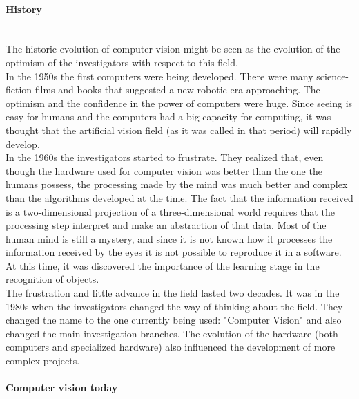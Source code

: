 \paragraph{History}\mbox{}\\

The historic evolution of computer vision might be seen as the evolution of the optimism of the investigators with respect to this field. 
\\

In the 1950s the first computers were being developed. There were many science-fiction films and books that suggested a new robotic era approaching. The optimism and the confidence in the power of computers were huge. 
Since seeing is easy for humans and the computers had a big capacity for computing, it was thought that the artificial vision field (as it was called in that period) will rapidly develop. 
\\

In the 1960s the investigators started to frustrate. They realized that, even though the hardware used for computer vision was better than the one the humans possess, the processing made by the mind was much better and complex than the algorithms developed at the time. 
The fact that the information received is a two-dimensional projection of a three-dimensional world requires that the processing step interpret and make an abstraction of that data. Most of the human mind is still a mystery, and since it is not known how it processes the information received by the eyes it is not possible to reproduce it in a software. 
At this time, it was discovered the importance of the learning stage in the recognition of objects. 
\\

The frustration and little advance in the field lasted two decades. It was in the 1980s when the investigators changed the way of thinking about the field. They changed the name to the one currently being used: "Computer Vision" and also changed the main investigation branches.
The evolution of the hardware (both computers and specialized hardware) also influenced the development of more complex projects. 
\\

\paragraph{Computer vision today}\mbox{}\\

